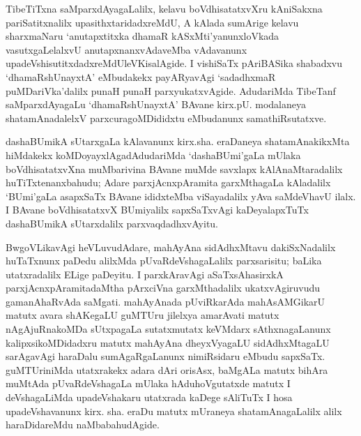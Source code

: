 TibeTiTxna saMparxdAyagaLalilx, kelavu boVdhisatatxvXru kAniSakxna pariSatitxnalilx upa\-sithxta\-ridadxreMdU, A kAlada sumArige kelavu sharxmaNaru `anutapxtitxka dhamaR kASxMti'yanunx\break loVkada vasutxgaLelalxvU anutapxnanxvAdaveMba vAdavanunx upadeVshisutitxdadxreMdU\break leVKisalAgide. I vishiSaTx pAriBASika shabadxvu `dhamaRshUnayxtA' eMbudakekx payARya\-vAgi `sadadhxmaR puMDariVka'dalilx punaH punaH parxyukatxvAgide. AdudariMda TibeTanf saMparxdAyagaLu `dhamaRshUnayxtA' BAvane kirx.pU. modalaneya shatamAnadalelxV parxcuragoMDididxtu eMbudanunx samathiRsutatxve.

dashaBUmikA sUtarxgaLa kAlavanunx kirx.sha. eraDaneya shatamAnakikxMta hiMdakekx koMDoyayxlAgadAdudariMda `dashaBUmi'gaLa mUlaka boVdhisatatxvXna muMbarivina BAvane muMde savxlapx kAlAnaMtaradalilx huTiTxtenanxbahudu; Adare parxjAcnxpAramita garxMthagaLa kAladalilx `BUmi'gaLa asapxSaTx BAvane ididxteMba viSayadalilx yAva saMdeVhavU ilalx. I BAvane boVdhisatatxvX BUmiyalilx sapxSaTxvAgi kaDeyalapxTuTx dashaBUmikA sUtarxdalilx parxvaqdadhxvAyitu.

BwgoVLikavAgi heVLuvudAdare, mahAyAna sidAdhxMtavu dakiSxNadalilx huTaTxnunx paDedu alilxMda pUvaRdeVshagaLalilx parxsarisitu; baLika utatxradalilx ELige paDeyitu. I parxkAravAgi aSaTxsAhasirxkA parxjAcnxpAramitadaMtha pArxciVna garxMthadalilx ukatxvAgi\-ruvudu gamanAhaRvAda saMgati. mahAyAnada pUviRkarAda mahAsAMGikarU matutx avara shAKegaLU guMTUru jilelxya amarAvati matutx nAgAjuRnakoMDa sUtxpagaLa sutatxmutatx keVMdarx sAthxnagaLanunx kalipxsikoMDidadxru matutx mahAyAna dheyxVyagaLU sidAdhxMtagaLU sarAgavAgi haraDalu sumAgaRgaLanunx nimiRsidaru eMbudu sapxSaTx. guMTUriniMda utatxrakekx adara dAri orisAsx, baMgALa matutx bihAra muMtAda pUvaRdeVshagaLa mUlaka hAduhoVgutatxde matutx I deVshagaLiMda upadeVshakaru utatxrada kaDege sAliTuTx I hosa upadeVshavanunx kirx. sha. eraDu matutx mUraneya shatamAnagaLalilx alilx haraDidareMdu naMbabahudAgide.

\theendnotes
